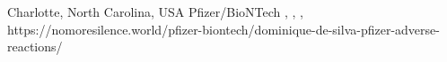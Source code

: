           {Charlotte, North Carolina, USA}
          {}
          {Pfizer/BioNTech}
          {}
          {
            ,
            ,
            ,
          }
          {https://nomoresilence.world/pfizer-biontech/dominique-de-silva-pfizer-adverse-reactions/}

